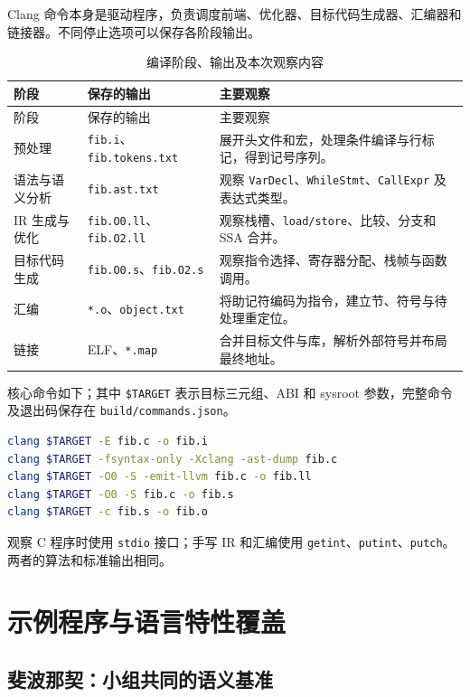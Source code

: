 \documentclass[UTF8,a4paper,10pt]{ctexart}
\begin{document}
Clang 命令本身是驱动程序，负责调度前端、优化器、目标代码生成器、汇编器和链接器。不同停止选项可以保存各阶段输出\cite{clang-guide}。

\begin{longtable}{p{2.6cm}p{3.9cm}p{6.7cm}}
  \caption{编译阶段、输出及本次观察内容}\label{tab:stages}\\
  \toprule
  阶段 & 保存的输出 & 主要观察 \\
  \midrule
  \endfirsthead
  \toprule
  阶段 & 保存的输出 & 主要观察 \\
  \midrule
  \endhead
  预处理 & \texttt{fib.i}、\texttt{fib.tokens.txt} & 展开头文件和宏，处理条件编译与行标记，得到记号序列。 \\
  语法与语义分析 & \texttt{fib.ast.txt} & 观察 \texttt{VarDecl}、\texttt{WhileStmt}、\texttt{CallExpr} 及表达式类型。 \\
  IR 生成与优化 & \texttt{fib.O0.ll}、\texttt{fib.O2.ll} & 观察栈槽、\texttt{load/store}、比较、分支和 SSA 合并。 \\
  目标代码生成 & \texttt{fib.O0.s}、\texttt{fib.O2.s} & 观察指令选择、寄存器分配、栈帧与函数调用。 \\
  汇编 & \texttt{*.o}、\texttt{object.txt} & 将助记符编码为指令，建立节、符号与待处理重定位。 \\
  链接 & ELF、\texttt{*.map} & 合并目标文件与库，解析外部符号并布局最终地址。 \\
  \bottomrule
\end{longtable}

核心命令如下；其中 \texttt{\$TARGET} 表示目标三元组、ABI 和 sysroot 参数，完整命令及退出码保存在 \texttt{build/commands.json}。

\begin{lstlisting}[language=bash,caption={编译流程中的阶段命令}]
clang $TARGET -E fib.c -o fib.i
clang $TARGET -fsyntax-only -Xclang -ast-dump fib.c
clang $TARGET -O0 -S -emit-llvm fib.c -o fib.ll
clang $TARGET -O0 -S fib.c -o fib.s
clang $TARGET -c fib.s -o fib.o
\end{lstlisting}

观察 C 程序时使用 \texttt{stdio} 接口；手写 IR 和汇编使用 \texttt{getint}、\texttt{putint}、\texttt{putch}。两者的算法和标准输出相同。

\section{示例程序与语言特性覆盖}

\subsection{斐波那契：小组共同的语义基准}
\end{document}
